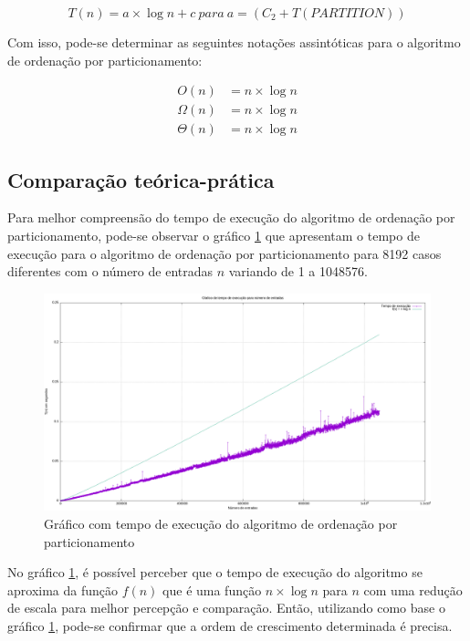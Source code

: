 \begin{equation} \label{cap:2:eq:quickSort:2}
    T(n) = a \times \log n + c\  para\  a = (C_2 + T(PARTITION))
\end{equation}

Com isso, pode-se determinar as seguintes notações assintóticas para o algoritmo de ordenação por particionamento:

\begin{align*} \label{cap:2:eq:quickSort:3}
    O(n) &= n \times \log n \\ 
    \Omega(n) &= n \times \log n \\
    \Theta(n) &= n \times \log n
\end{align*}

\subsection{Comparação teórica-prática}

Para melhor compreensão do tempo de execução do algoritmo de ordenação por particionamento, pode-se observar o gráfico 
\ref{cap:2:graph:quickSort} que apresentam o tempo de execução para o algoritmo de ordenação por particionamento
para 8192 casos diferentes com o número de entradas $n$ variando de 1 a 1048576.

\begin{figure}[h]
    \centering
    \includegraphics[width=\textwidth]{image/graphics/quickSort.png}
    \caption{Gráfico com tempo de execução do algoritmo de ordenação por particionamento}
    \label{cap:2:graph:quickSort}
\end{figure}

No gráfico \ref{cap:2:graph:quickSort}, é possível perceber que o tempo de execução do algoritmo se aproxima
da função $f(n)$ que é uma função $n \times \log n$ para $n$ com uma redução de escala para melhor percepção e comparação. Então,
utilizando como base o gráfico \ref{cap:2:graph:quickSort}, pode-se confirmar que a ordem de crescimento determinada é
precisa.

